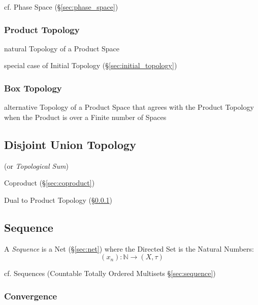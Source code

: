 cf. Phase Space (\S\ref{sec:phase_space})



\subsubsection{Product Topology}\label{sec:product_topology}

natural Topology of a Product Space

special case of Initial Topology (\S\ref{sec:initial_topology})



\subsubsection{Box Topology}\label{sec:box_topology}

alternative Topology of a Product Space that agrees with the Product Topology
when the Product is over a Finite number of Spaces



\subsection{Disjoint Union Topology}\label{sec:disjoint_union_topology}

(or \emph{Topological Sum})

Coproduct (\S\ref{sec:coproduct})

Dual to Product Topology (\S\ref{sec:product_topology})



\subsection{Sequence}\label{sec:sequence_topology}

A \emph{Sequence} is a Net (\S\ref{sec:net}) where the Directed Set is
the Natural Numbers:
\[
  (x_n) : \mathbb{N} \rightarrow (X,\tau)
\]

cf. Sequences (Countable Totally Ordered Multisets \S\ref{sec:sequence})



\subsubsection{Convergence}\label{sec:convergence}

